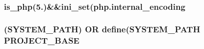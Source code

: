 \subsubsection[{is\+\_\+php}]{\setlength{\rightskip}{0pt plus 5cm}is\+\_\+php(\textquotesingle{}5.\textquotesingle{})\&\&ini\+\_\+set(\textquotesingle{}php.\+internal\+\_\+encoding\textquotesingle{}}\label{tests_2_bootstrap_8php_acbea7ca989439eea4c6019ad3c5161aa}
\hypertarget{tests_2_bootstrap_8php_a8731a5d504a6592ae43e07a048933c32}{}
\subsubsection[{P\+R\+O\+J\+E\+C\+T\+\_\+\+B\+A\+S\+E}]{ (\textquotesingle{}S\+Y\+S\+T\+E\+M\+\_\+\+P\+A\+T\+H\textquotesingle{}) O\+R define(\textquotesingle{}S\+Y\+S\+T\+E\+M\+\_\+\+P\+A\+T\+H\textquotesingle{} P\+R\+O\+J\+E\+C\+T\+\_\+\+B\+A\+S\+E}\label{tests_2_bootstrap_8php_a8731a5d504a6592ae43e07a048933c32}
